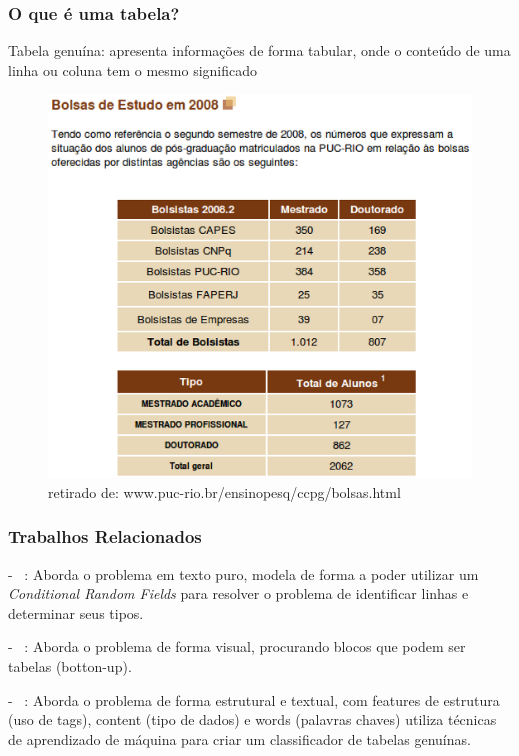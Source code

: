 \documentclass{beamer}
\newenvironment{my_itemize}{
\begin{itemize}
  \setlength{\itemsep}{5pt}
  \setlength{\parskip}{2pt}
  \setlength{\parsep}{3pt}
}{\end{itemize}}
\begin{document}
\begin{frame}
\frametitle{O que é uma tabela?}
    \begin{my_itemize}
      \item Tabela genuína: apresenta informações de forma tabular, onde o conteúdo de uma linha ou coluna tem o mesmo significado
    \end{my_itemize}

\begin{figure}[h]
  \center
  \includegraphics[scale=0.25]{img/table}
  \caption{retirado de: www.puc-rio.br/ensinopesq/ccpg/bolsas.html}
\end{figure}

\end{frame}


\begin{frame}
\frametitle{Trabalhos Relacionados}

  \begin{my_itemize}
    \item[-] ~\cite{Pinto2003}: Aborda o problema em texto puro, modela
    de forma a poder utilizar um {\it Conditional Random Fields} para resolver o problema de identificar linhas e determinar seus tipos.

\pause
   \item[-] ~\cite{Krupl2006}: Aborda o problema de forma visual,
   procurando blocos que podem ser tabelas (botton-up).

\pause
   \item[-] ~\cite{Wang2002}: Aborda o problema de forma estrutural e textual, com features de estrutura (uso de tags), content (tipo de dados) e words (palavras chaves) utiliza técnicas de aprendizado de máquina para criar um classificador de tabelas genuínas.

  \end{my_itemize}

\end{frame}
\end{document}
